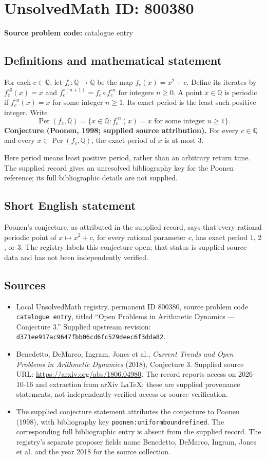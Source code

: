 \documentclass[11pt]{article}
\newcommand{\Q}{\mathbb{Q}}
\begin{document}
\section*{UnsolvedMath ID: 800380}
\textbf{Source problem code:} catalogue entry
\subsection{Definitions and mathematical statement}
For each \(c\in\Q\), let \(f_c\colon\Q\to\Q\) be the map \(f_c(x)=x^2+c\). Define its iterates by \(f_c^{\circ 0}(x)=x\) and \(f_c^{\circ(n+1)}=f_c\circ f_c^{\circ n}\) for integers \(n\geq 0\). A point \(x\in\Q\) is periodic if \(f_c^{\circ n}(x)=x\) for some integer \(n\geq 1\). Its exact period is the least such positive integer. Write
\[
\operatorname{Per}(f_c,\Q)=\{x\in\Q: f_c^{\circ n}(x)=x\text{ for some integer }n\geq 1\}.
\]
\textbf{Conjecture (Poonen, 1998; supplied source attribution).} For every \(c\in\Q\) and every \(x\in\operatorname{Per}(f_c,\Q)\), the exact period of \(x\) is at most \(3\).

Here period means least positive period, rather than an arbitrary return time. The supplied record gives an unresolved bibliography key for the Poonen reference; its full bibliographic details are not supplied.
\subsection{Short English statement}
Poonen's conjecture, as attributed in the supplied record, says that every rational periodic point of \(x\mapsto x^2+c\), for every rational parameter \(c\), has exact period \(1\), \(2\), or \(3\). The registry labels this conjecture open; that status is supplied source data and has not been independently verified.
\subsection{Sources}
\begin{itemize}
\item Local UnsolvedMath registry, permanent ID \(800380\), source problem code \texttt{catalogue entry}, titled ``Open Problems in Arithmetic Dynamics --- Conjecture 3.'' Supplied upstream revision: \texttt{d371ee917ac9647fbb06cd6fc529deec6f3dda82}.
\item Benedetto, DeMarco, Ingram, Jones et al., \emph{Current Trends and Open Problems in Arithmetic Dynamics} (2018), Conjecture 3. Supplied source URL: \url{https://arxiv.org/abs/1806.04980}. The record reports access on 2026-10-16 and extraction from arXiv LaTeX; these are supplied provenance statements, not independently verified access or source verification.
\item The supplied conjecture statement attributes the conjecture to Poonen (1998), with bibliography key \texttt{poonen:uniformboundrefined}. The corresponding full bibliographic entry is absent from the supplied record. The registry's separate proposer fields name Benedetto, DeMarco, Ingram, Jones et al. and the year 2018 for the source collection.
\end{itemize}
\end{document}
